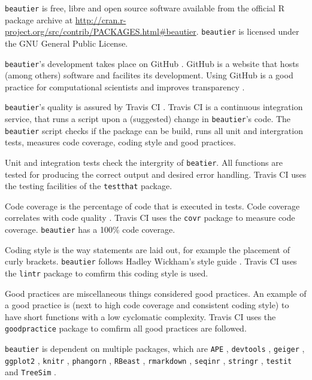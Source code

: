 \documentclass{article}
\begin{document}
\verb;beautier; is free, libre and open source software available from the official R package archive at 
\url{http://cran.r-project.org/src/contrib/PACKAGES.html\#beautier}.  
\verb;beautier; is licensed under the GNU General Public License.

\verb;beautier;'s development takes place on GitHub \cite{github}. 
GitHub is a website that hosts (among others) software and facilites its development.
Using GitHub is a good practice for computational scientists \cite{perez2016ten} 
and improves transparency \cite{gorgolewski2016practical}.

\verb;beautier;'s quality is assured by Travis CI \cite{travis}. Travis CI is
a continuous integration service, that runs a script upon a (suggested)
change in \verb;beautier;'s code. The \verb;beautier; script checks if the
package can be build, runs all unit and intergration tests, 
measures code coverage, coding style and good practices.

Unit and integration tests check the intergrity of \verb;beatier;. All functions
are tested for producing the correct output and desired error handling. 
Travis CI uses the testing facilities of the \verb;testthat; \cite{testthat} package.

Code coverage is the percentage of code that is executed in tests. 
Code coverage correlates with code quality \cite{del1995correlation}. 
Travis CI uses the \verb;covr; \cite{covr} package to measure code coverage. 
\verb;beautier; has a 100\% code coverage. 

Coding style is the way statements are laid out, for example the placement of 
curly brackets. \verb;beautier; follows Hadley Wickham's style guide \cite{style_guide}. 
Travis CI uses the \verb;lintr; \cite{lintr} package to comfirm this coding style
is used.

Good practices are miscellaneous things considered good practices. An example
of a good practice is (next to high code coverage and consistent coding style) 
to have short functions with a low cyclomatic complexity. Travis CI uses 
the \verb;goodpractice; \cite{goodpractice} package to comfirm all good practices
are followed.

\verb;beautier; is dependent on multiple packages, which are 
\verb;APE; \cite{APE}, 
\verb;devtools; \cite{devtools},
\verb;geiger; \cite{GEIGER},
\verb;ggplot2; \cite{ggplot2},
\verb;knitr; \cite{knitr},
\verb;phangorn; \cite{phangorn},
\verb;RBeast; \cite{RBeast},
\verb;rmarkdown; \cite{rmarkdown},
\verb;seqinr; \cite{seqinr},
\verb;stringr; \cite{stringr},
\verb;testit; \cite{testit} and 
\verb;TreeSim; \cite{TreeSim}.
\end{document}
